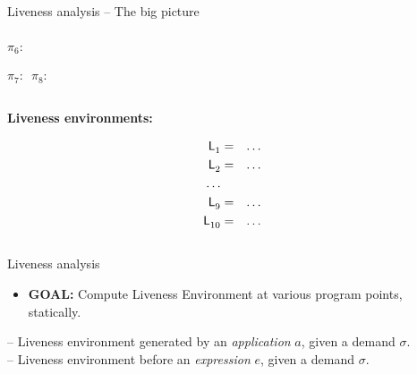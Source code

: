 \begin{frame}[t]{Liveness analysis -- The big picture}
\begin{columns}[c]
\begin{column}[T]{0.6\textwidth}
{\begin{uprogram}
          \hspace*{-2.4cm} \hspace*{.05cm}   $\pi_6\!\!:\, $


          \hspace*{-2.7cm}  \hspace*{.05cm}   $\pi_7\!\!:\,$
$\pi_8\!\!:\, $ 
\end{uprogram}}
 \end{column}
\end{columns}

\bigskip
\bigskip

\footnotesize

\begin{columns}[c]
  \begin{column}[T]{0.33\textwidth}
    \centerline{\bf Liveness environments:}
    \begin{eqnarray*}
      \mathsf{L}_{{1}}^{} &=& \ldots\\
      \mathsf{L}_{{2}}^{} &=& \ldots\\
      \ldots &&\\
      \mathsf{L}_{{9}}^{} &=& \ldots\\
      \mathsf{L}_{{10}}^{} &=& \ldots
    \end{eqnarray*}
  \end{column}
   
\end{columns}
\end{frame}
\begin{frame}{Liveness analysis}
  \begin{itemize}
  \item {\bf  GOAL:} Compute  Liveness Environment at  various program
    points, statically.
  \end{itemize}
  \bigskip\pause
    --  Liveness  environment  generated  by  an  {\em
    application} $a$, given a demand $\sigma$.\\
  \bigskip
   -- Liveness environment  before an {\em expression}
  $e$, given a demand $\sigma$.

\end{frame}
